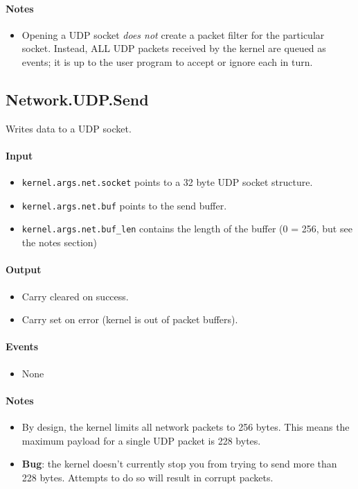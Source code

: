 \paragraph{Notes}
\begin{itemize}
\item Opening a UDP socket {\em does not} create a packet filter for the particular socket.  Instead, ALL UDP packets received by the kernel are queued as events; it is up to the user program to accept or ignore each in turn.
\end{itemize}

\subsection*{Network.UDP.Send}
Writes data to a UDP socket.

\paragraph{Input}
\begin{itemize}
\item \verb+kernel.args.net.socket+ points to a 32 byte UDP socket structure.
\item \verb+kernel.args.net.buf+ points to the send buffer.
\item \verb+kernel.args.net.buf_len+ contains the length of the buffer (0 = 256, but see the notes section)
\end{itemize}

\paragraph{Output}
\begin{itemize}
\item Carry cleared on success.
\item Carry set on error (kernel is out of packet buffers).
\end{itemize}

\paragraph{Events}
\begin{itemize}
\item None
\end{itemize}

\paragraph{Notes}
\begin{itemize}
\item By design, the kernel limits all network packets to 256 bytes.  This means the maximum payload for a single UDP packet is 228 bytes.
\item {\bf Bug}: the kernel doesn't currently stop you from trying to send more than 228 bytes.  Attempts to do so will result in corrupt packets.
\end{itemize}

